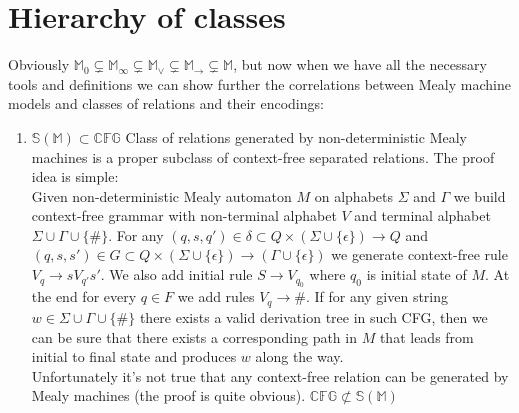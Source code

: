 \documentclass[12pt]{article}
\begin{document}
\section{Hierarchy of classes} Obviously $\mathbb{M}_0 \subsetneq \mathbb{M}_{\infty}  \subsetneq \mathbb{ M}_\vee \subsetneq \mathbb{M}_{\rightarrow}  \subsetneq \mathbb{M} $, but now when we have all the necessary tools and definitions we  can show further the correlations between Mealy machine models and classes of relations and their encodings:
 \begin{enumerate}


\item $\mathbb{S}(\mathbb{M}) \subset \mathbb{CFG}$ Class of relations generated by non-deterministic Mealy machines is a proper subclass of context-free separated relations. The proof idea is simple: \\
Given non-deterministic Mealy automaton $M$ on alphabets $\Sigma$ and $\Gamma$ we build context-free grammar with non-terminal alphabet $V$ and terminal alphabet $\Sigma \cup \Gamma \cup \{\#\}$. For any $(q,s,q') \in \delta \subset Q \times (\Sigma \cup \{\epsilon\}) \rightarrow Q$ and $(q,s,s') \in G \subset Q \times (\Sigma \cup \{\epsilon\}) \rightarrow (\Gamma \cup \{\epsilon\})$ we generate context-free rule $V_q \rightarrow s V_{q'} s'$.  We also add initial rule $S \rightarrow V_{q_0}$ where $q_0$ is initial state of $M$. At the end for every $q \in F$ we add rules $V_q \rightarrow \#$. If for any given string $w \in \Sigma \cup \Gamma \cup \{\#\}$ there exists a valid derivation tree in such CFG, then we can be sure that there exists a corresponding path in $M$ that leads from initial to final state and produces $w$ along the way. \\
Unfortunately it's not true that any context-free relation can be generated by Mealy machines (the proof is quite obvious). $ \mathbb{CFG} \not\subset \mathbb{S}(\mathbb{M})$


\end{enumerate}
\end{document}
